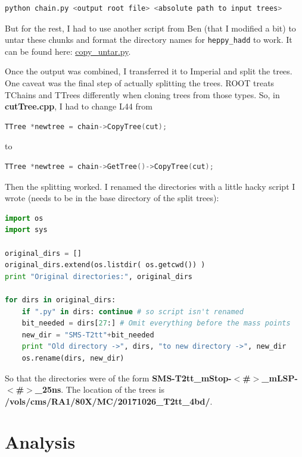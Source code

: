 \begin{lstlisting}[belowskip=-0.7cm, language=sh, numbers=none]
python chain.py <output root file> <absolute path to input trees>
\end{lstlisting}

But for the rest, I had to use another script from Ben (that I modified a bit) to untar these chunks and format the directory names for \texttt{heppy\_hadd} to work. It can be found here: \href{run:sec31/copy_untar.py}{copy\_untar.py}.

Once the output was combined, I transferred it to Imperial and split the trees. One caveat was the final step of actually splitting the trees. ROOT treats TChains and TTrees differently when cloning trees from those types. So, in \textbf{cutTree.cpp}, I had to change L44 from

\begin{lstlisting}[belowskip=-0.7cm, language=C++, numbers=none]
TTree *newtree = chain->CopyTree(cut);
\end{lstlisting}

to

\begin{lstlisting}[belowskip=-0.7cm, language=C++, numbers=none]
TTree *newtree = chain->GetTree()->CopyTree(cut);
\end{lstlisting}

Then the splitting worked. I renamed the directories with a little hacky script I wrote (needs to be in the base directory of the split trees):

\begin{lstlisting}[belowskip=-0.7cm, language=python, numbers=none]
import os
import sys

original_dirs = []
original_dirs.extend(os.listdir( os.getcwd()) )
print "Original directories:", original_dirs

for dirs in original_dirs:
    if ".py" in dirs: continue # so script isn't renamed
    bit_needed = dirs[27:] # Omit everything before the mass points
    new_dir = "SMS-T2tt"+bit_needed
    print "Old directory ->", dirs, "to new directory ->", new_dir
    os.rename(dirs, new_dir)
\end{lstlisting}

So that the directories were of the form \textbf{SMS-T2tt\_mStop-$<$\#$>$\_mLSP-$<$\#$>$\_25ns}. The location of the trees is \textbf{/vols/cms/RA1/80X/MC/20171026\_T2tt\_4bd/}.


\section{Analysis}

